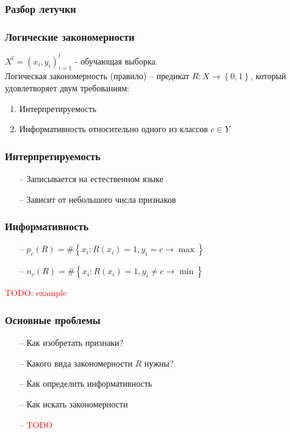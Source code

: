\documentclass[12pt]{beamer}
\subtitle{Лекция 8. Логические алгоритмы классификации.}
\begin{document}
	
\frame{\titlepage}

\begin{frame}\frametitle{Разбор летучки}

\end{frame}


\begin{frame}\frametitle{Логические закономерности}
${X^l = \left( x_i, y_i \right)_{i=1}^l}$ - обучающая выборка.\\
Логическая закономерность (правило) -- предикат ${R: X \rightarrow \left\{ 0, 1 \right\} }$, который удовлетворяет двум требованиям:\\
\begin{enumerate}
	\item Интерпретируемость
	\item Информативность относительно одного из классов ${c \in Y}$
\end{enumerate}
\end{frame}


\begin{frame}\frametitle{Интерпретируемость}
	\begin{itemize}
		\item[--] Записывается на естественном языке
		\item[--] Зависит от небольшого числа признаков
	\end{itemize}
\end{frame}

\begin{frame}\frametitle{Информативность}
	\begin{itemize}
		\item[--] ${ p_c(R) = \# \left\{ x_i: R(x_i) = 1 , y_i = c \rightarrow \max \right\} }$
		\item[--] ${ n_c(R) = \# \left\{ x_i: R(x_i) = 1 , y_i \neq c \rightarrow \min \right\} }$
	\end{itemize}
	\textcolor{red}{TODO: example}
\end{frame}

\begin{frame}\frametitle{Основные проблемы}
	\begin{itemize}
		\item[--] Как изобретать признаки? 
		\item[--] Какого вида закономерности $R$ нужны?
		\item[--] Как определить информативность		
		\item[--] Как искать закономерности		
		\item[--] \textcolor{red}{TODO}
	\end{itemize}
\end{frame}
\end{document}
